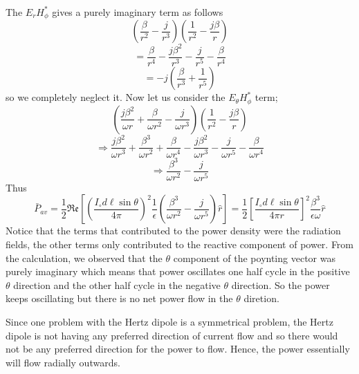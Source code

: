 \paragraph{}
The $E_rH_\phi^*$ gives a purely imaginary term as follows
$$\left(\dfrac{\beta}{r^2} - \dfrac{j}{r^3}\right)\left(\dfrac{1}{r^2} 
 - \dfrac{j\beta}{r}\right)$$
$$=  \dfrac{\beta}{r^4} - \dfrac{j\beta^2}{r^3} 
- \dfrac{j}{r^5} - \dfrac{\beta}{r^4} $$
$$= -j\left( \dfrac{\beta}{r^3}  +  \dfrac{1}{r^5}\right) $$
so we completely neglect it. Now let us consider the $E_\theta H_\phi^*$ term;
$$\left(\dfrac{j\beta^2}{\omega r} + \dfrac{\beta}{\omega r^2} - \dfrac{j}{\omega r^3}\right)\left(\dfrac{1}{r^2} - \dfrac{j\beta}{r}\right)$$
$$\Longrightarrow \dfrac{j\beta^2}{\omega r^3} 
+ \dfrac{\beta^3}{\omega r^2} + \dfrac{\beta}{\omega r^4} 
- \dfrac{j\beta^2}{\omega r^3} - \dfrac{j}{\omega r^5}
- \dfrac{\beta}{\omega r^4}$$
$$\Longrightarrow \dfrac{\beta^3}{\omega r^2} - \dfrac{j}{\omega r^5}$$
Thus \quad  
\begin{dmath*}
\bar{P}_{av} = \dfrac{1}{2}\mathfrak{Re}\left[\left(\dfrac{I_\circ d\ell\sin\theta}{4\pi}\right)^2\dfrac{1}{\epsilon} \left(\dfrac{\beta^3}{\omega r^2} - \dfrac{j}{\omega r^5}\right)\hat{r}\right]
= \dfrac{1}{2}
\left[\dfrac{I_\circ d\ell\sin\theta}{4\pi r}\right]^2 \dfrac{\beta^3}{\epsilon\omega}\hat{r} 
\end{dmath*}
Notice that the terms that contributed to the power density were the radiation fields, the other terms only contributed to the reactive component of power. From the calculation, we observed that the $\theta$  component of the poynting vector was purely imaginary which means that power oscillates one half cycle in the positive $\theta$ direction and the other half cycle in the negative $\theta$ direction. So the power keeps oscillating but there is no net power flow in the $\theta$ diretion.

Since one problem with the Hertz dipole is a symmetrical problem, the Hertz dipole is not having any preferred direction of current flow and so there would not be any preferred direction for the power to flow. Hence, the power essentially will flow radially outwards.

